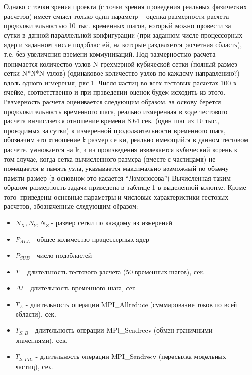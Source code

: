 Однако с точки зрения проекта (с точки зрения проведения реальных физических расчетов) имеет смысл только один параметр – оценка размерности расчета продолжительностью 10 тыс. временных шагов,  который можно провести за сутки в данной параллельной конфигурации (при заданном числе процессорных ядер и заданном числе подобластей, на которые разделяется расчетная область), т.е. без увеличения времени коммуникаций. Под размерностью расчета понимается количество узлов N трехмерной кубической сетки (полный размер сетки N*N*N узлов) (одинаковое количество узлов по каждому направлению?) вдоль одного измерения, рис.1. Число частиц во всех тестовых расчетах 100 в ячейке, соответственно и при проведении оценок будем исходить из этого. Размерность расчета оценивается следующим образом:
за основу берется продолжительность временного шага, реально измеренная в ходе тестового расчета
вычисляется отношение времени 8.64 сек. (один шаг из 10 тыс., проводимых за сутки) к измеренной продолжительности временного шага, обозначим это отношение k
размер сетки, реально имеющийся в данном тестовом расчете, умножается на k, и из произведения извлекается кубический корень
в том случае, когда сетка вычисленного размера (вместе с частицами) не помещается в память узла, указывается максимально возможный по объему памяти размер (в основном это касается “Ломоносова”)
Вычисленная таким образом размерность задачи приведена в таблице 1 в выделенной колонке. Кроме того, приведены основные параметры и числовые характеристики тестовых расчетов, обозначенные следующим образом:
\begin{itemize}
	\item $N_X, N_Y, N_Z$  - размер сетки по каждому из измерений
	\item $P_{ALL}$  - общее количество процессорных ядер
	\item $P_{SUB}$  - число подобластей
	\item $T$ – длительность тестового расчета (50 временных шагов), сек.
	\item $\Delta t$  - длительность временного шага, сек.
	\item $T_{A}$ - длительность операции MPI\_Allreduce (суммирование токов по всей области), сек.
	\item $T_{S,B}$ - длительность операции MPI\_Sendrecv (обмен граничными значениями), сек.
	\item $T_{S,PIC}$ - длительность операции MPI\_Sendrecv (пересылка модельных частиц), сек.
\end{itemize}



